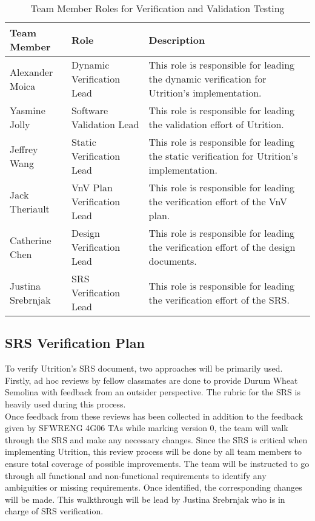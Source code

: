 \documentclass[12pt, titlepage]{article}
\begin{document}
	\begin{table}[H]
		\centering
		\label{Table:Testing_Roles}
		\begin{tabular}{|p{3.2cm}|p{4cm}|p{5.5cm}|}
			\hline
			\textbf{Team Member} & \textbf{Role} & \textbf{Description}\\ \hline
			Alexander Moica& Dynamic Verification Lead& This role is responsible for leading the dynamic verification for Utrition's implementation.\\ \hline
			Yasmine Jolly& Software Validation Lead & This role is responsible for leading the validation effort of Utrition.\\ \hline
			Jeffrey Wang& Static Verification Lead & This role is responsible for leading the static verification for Utrition's implementation.\\ \hline
			Jack Theriault& VnV Plan Verification Lead& This role is responsible for leading the verification effort of the VnV plan.\\ \hline
			Catherine Chen& Design Verification Lead& This role is responsible for leading the verification effort of the design documents.\\ \hline
			Justina Srebrnjak& SRS Verification Lead& This role is responsible for leading the verification effort of the SRS. \\ \hline
		\end{tabular}
		\caption{Team Member Roles for Verification and Validation Testing}
	\end{table} 
	
	\subsection{SRS Verification Plan}
	
	
	
	To verify Utrition's SRS document, two approaches will be primarily used. Firstly, ad hoc reviews by fellow classmates are done to provide Durum Wheat Semolina with feedback from an outsider perspective. The rubric for the SRS is heavily used during this process. \\
	
	Once feedback from these reviews has been collected in addition to the feedback given by SFWRENG 4G06 TAs while marking version 0, the team will walk through the SRS and make any necessary changes. Since the SRS is critical when implementing Utrition, this review process will be done by all team members to ensure total coverage of possible improvements. The team will be instructed to go through all functional and non-functional requirements to identify any ambiguities or missing requirements. Once identified, the corresponding changes will be made. This walkthrough will be lead by Justina Srebrnjak who is in charge of SRS verification.
\end{document}
